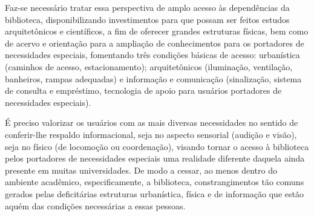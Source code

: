 


	Faz-se necessário tratar essa perspectiva de amplo acesso às dependências da biblioteca, disponibilizando investimentos para que possam ser feitos estudos arquitetônicos e científicos, a fim de oferecer grandes estruturas físicas, bem como de acervo e orientação para a ampliação de conhecimentos para os portadores de necessidades especiais, fomentando três condições básicas de acesso: urbanística (caminhos de acesso, estacionamento); arquitetônicos (iluminação, ventilação, banheiros, rampas adequadas) e informação e comunicação (sinalização, sistema de consulta e empréstimo, tecnologia de apoio para usuários portadores de necessidades especiais).
	
	É preciso valorizar os usuários com as mais diversas necessidades no sentido de conferir-lhe respaldo informacional, seja no aspecto sensorial (audição e visão), seja no físico (de locomoção ou coordenação), visando tornar o acesso à biblioteca pelos portadores de necessidades especiais uma realidade diferente daquela ainda presente em muitas universidades. De modo a cessar, ao menos dentro do ambiente acadêmico, especificamente, a biblioteca, constrangimentos tão comuns gerados pelas deficitárias estruturas urbanística, física e de informação que estão aquém das condições necessárias a essas pessoas.
	
